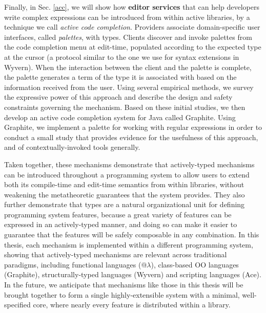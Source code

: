 Finally, in Sec. \ref{acc}, we will show how \textbf{editor services} that can help developers write complex expressions can be introduced from within active libraries, by a technique we call \emph{active code completion}. Providers associate
domain-specific user interfaces, called \emph{palettes}, with types. Clients discover and invoke palettes from the code completion menu at edit-time, populated according to the expected type at the cursor (a protocol similar to the one we use for syntax extensions in Wyvern). When the interaction between the client and the palette is complete, the palette generates a term of the type it is associated with based on the information received from the user. Using several empirical
methods, we survey\- the expressive power of this approach and describe the design and safety constraints governing
the mechanism. Based on these initial studies, we then develop an active code completion system for Java called Graphite. Using Graphite,
we implement a palette for working with regular expressions in order to conduct a small study that provides evidence for the usefulness of this approach, and of contextually-invoked tools generally.

Taken together, these mechanisms demonstrate that actively-typed mechanisms can be introduced throughout a programming system to allow users to extend both its compile-time and edit-time semantics from within libraries, without  weakening the metatheoretic guarantees that the system provides. They also further demonstrate that types are a natural organizational unit for defining programming system features, because a great variety of features can be expressed in an actively-typed manner, and doing so can make it easier to guarantee that the features will be safely composable in any combination. In this thesis, each mechanism is  implemented within a different programming system, showing that actively-typed mechanisms are relevant across traditional paradigms, including functional languages (@$\lambda$), class-based OO languages (Graphite), structurally-typed languages (Wyvern) and scripting languages (Ace). In the future, we anticipate that mechanisms like those in this thesis will be brought together to form a single highly-extensible system with a minimal, well-specified core, where nearly every feature is distributed within a library. 

